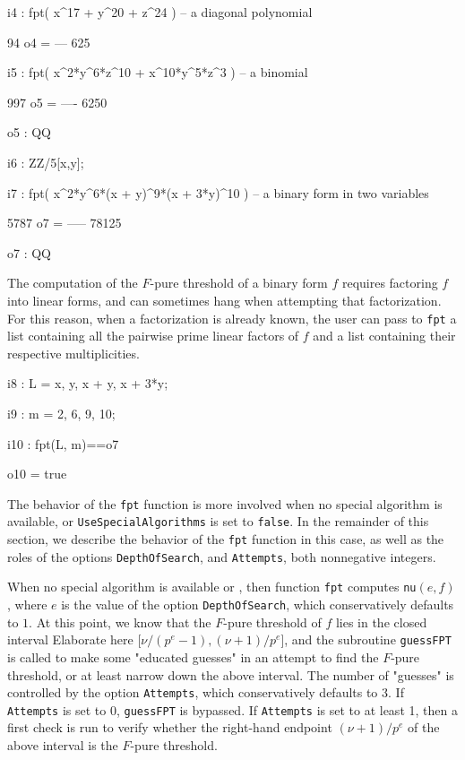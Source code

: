 \documentclass{amsart}
\begin{document}
\medskip
{\small
{}
\begin{MyVerbatim}
i4 : fpt( x^17 + y^20 + z^24 ) -- a diagonal polynomial

      94
o4 = ---
     625
     
i5 : fpt( x^2*y^6*z^10 + x^10*y^5*z^3 ) -- a binomial

      997
o5 = ----
     6250

o5 : QQ     

i6 : ZZ/5[x,y];

i7 : fpt( x^2*y^6*(x + y)^9*(x + 3*y)^10 ) -- a binary form in two variables

      5787
o7 = -----
     78125

o7 : QQ
\end{MyVerbatim}
}
       
            The computation of the $F$-pure threshold of a binary form $f$ requires factoring $f$ into linear forms, and can sometimes hang when attempting that factorization. For this reason, when a factorization is already known, the user can pass to {\tt fpt} a list containing all the pairwise prime linear factors of $f$ and a list containing their respective multiplicities.

\medskip
{\small
{}
\begin{MyVerbatim}
i8 : L = {x, y, x + y, x + 3*y};

i9 : m = {2, 6, 9, 10};

i10 : fpt(L, m)==o7

o10 = true
\end{MyVerbatim}
}

The behavior of the {\tt fpt} function is more involved when no special algorithm is available, or {\tt UseSpecialAlgorithms} is set to {\tt false}.  In the remainder of this section, we describe the behavior of the {\tt fpt} function in this case, as well as the roles of the options {\tt DepthOfSearch}, and {\tt Attempts}, both nonnegative integers.

            When no special algorithm is available or , then function {\tt fpt} computes {\tt nu}$(e,f)$, where $e$ is the value of the option {\tt DepthOfSearch}, which conservatively defaults to $1$.
            At this point, we know that the $F$-pure threshold of $f$ lies in the closed interval {\color{red} Elaborate here} [$\nu/(p^e-1),(\nu+1)/p^e$], and the subroutine {\tt guessFPT} is called to make some "educated guesses" in an attempt to find the $F$-pure threshold, or at least narrow down the above interval.
	    The number of "guesses" is controlled by the option {\tt Attempts}, which conservatively defaults to 3.
            If {\tt Attempts} is set to 0, {\tt guessFPT} is bypassed.
            If  {\tt Attempts} is set to at least 1, then a first check is run to verify whether the right-hand endpoint $(\nu+1)/p^e$ of the above interval is the $F$-pure threshold.
 
\end{document}
